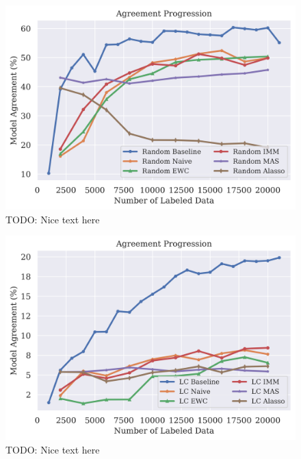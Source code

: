 \begin{figure}[h]
    \centering
    \includegraphics[width=0.8\linewidth]{images/results_CALMS/cifar_label_random.png}
    \caption[Agreement Comparison for Model Stealing on CIFAR10 using the top1-label and the Active Learning strategy Random]{TODO: Nice text here}
    \label{fig:CALMSCIFAR10LabelRandom}
\end{figure}

\begin{figure}[h]
    \centering
    \includegraphics[width=0.8\linewidth]{images/results_CALMS/cifar100_label_lc.png}
    \caption[Agreement Comparison for Model Stealing on CIFAR10 using the top1-label and the Active Learning strategy LC]{TODO: Nice text here}
    \label{fig:CALMSCIFAR10LabelLC}
\end{figure}

